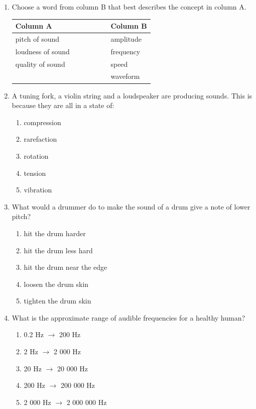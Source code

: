 \begin{eocexercises}{}

\begin{enumerate}

\item Choose a word from column B that best describes the concept in column A. \\
\begin{center}
\begin{tabular}{ll}
\textbf{Column A} & \textbf{Column B} \\ \hline
pitch of sound \ \ \ & amplitude \\
loudness of sound \ \ \ \ \ \ \ \ \ & frequency \\
quality of sound \ \ \ & speed \\
& waveform \\
\end{tabular}
\end{center}

\item A tuning fork, a violin string and a loudspeaker are producing sounds. This is because they are all in a state of:
\begin{enumerate}[label=\textbf{\alph*}.]
\item compression
\item rarefaction
\item rotation
\item tension
\item vibration
\end{enumerate}

\item What would a drummer do to make the sound of a drum give a note of lower pitch?
\begin{enumerate}[label=\textbf{\alph*}.]
\item hit the drum harder
\item hit the drum less hard
\item hit the drum near the edge
\item loosen the drum skin
\item tighten the drum skin
\end{enumerate}

\item What is the approximate range of audible frequencies for a healthy human?
\begin{enumerate}[label=\textbf{\alph*}.]
\item 0.2 Hz $\rightarrow$ 200 Hz
\item 2 Hz $\rightarrow$ 2 000 Hz
\item 20 Hz $\rightarrow$ 20 000 Hz
\item 200 Hz $\rightarrow$ 200 000 Hz
\item 2 000 Hz $\rightarrow$ 2 000 000 Hz
\end{enumerate}


\end{enumerate}
\end{eocexercises}
